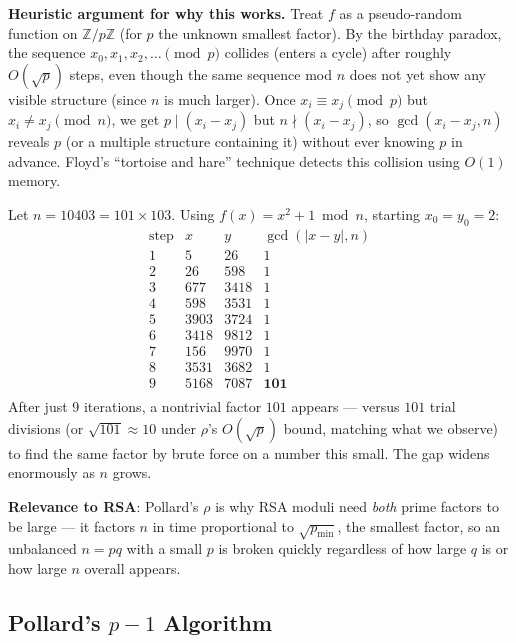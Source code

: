\medskip\noindent\textbf{Heuristic argument for why this works.} Treat $f$ as a pseudo-random function on $\mathbb{Z}/p\mathbb{Z}$ (for $p$ the unknown smallest factor). By the birthday paradox, the sequence $x_0, x_1, x_2, \dots \pmod p$ collides (enters a cycle) after roughly $O(\sqrt{p})$ steps, even though the same sequence mod $n$ does not yet show any visible structure (since $n$ is much larger). Once $x_i \equiv x_j \pmod p$ but $x_i \ne x_j \pmod n$, we get $p \mid (x_i - x_j)$ but $n \nmid (x_i - x_j)$, so $\gcd(x_i - x_j, n)$ reveals $p$ (or a multiple structure containing it) without ever knowing $p$ in advance. Floyd's ``tortoise and hare'' technique detects this collision using $O(1)$ memory.

\begin{example}
Let $n = 10403 = 101 \times 103$. Using $f(x) = x^2+1 \bmod n$, starting $x_0=y_0=2$:
\[
\begin{array}{c|ccc}
\text{step} & x & y & \gcd(|x-y|,n) \\
\hline
1 & 5 & 26 & 1 \\
2 & 26 & 598 & 1 \\
3 & 677 & 3418 & 1 \\
4 & 598 & 3531 & 1 \\
5 & 3903 & 3724 & 1 \\
6 & 3418 & 9812 & 1 \\
7 & 156 & 9970 & 1 \\
8 & 3531 & 3682 & 1 \\
9 & 5168 & 7087 & \mathbf{101} \\
\end{array}
\]
After just 9 iterations, a nontrivial factor $101$ appears — versus $101$ trial divisions (or $\sqrt{101} \approx 10$ under $\rho$'s $O(\sqrt{p})$ bound, matching what we observe) to find the same factor by brute force on a number this small. The gap widens enormously as $n$ grows.
\end{example}

\textbf{Relevance to RSA}: Pollard's $\rho$ is why RSA moduli need \emph{both} prime factors to be large — it factors $n$ in time proportional to $\sqrt{p_{\min}}$, the smallest factor, so an unbalanced $n = pq$ with a small $p$ is broken quickly regardless of how large $q$ is or how large $n$ overall appears.

\subsection{Pollard's $p-1$ Algorithm}\label{sec:pollard-p1}

